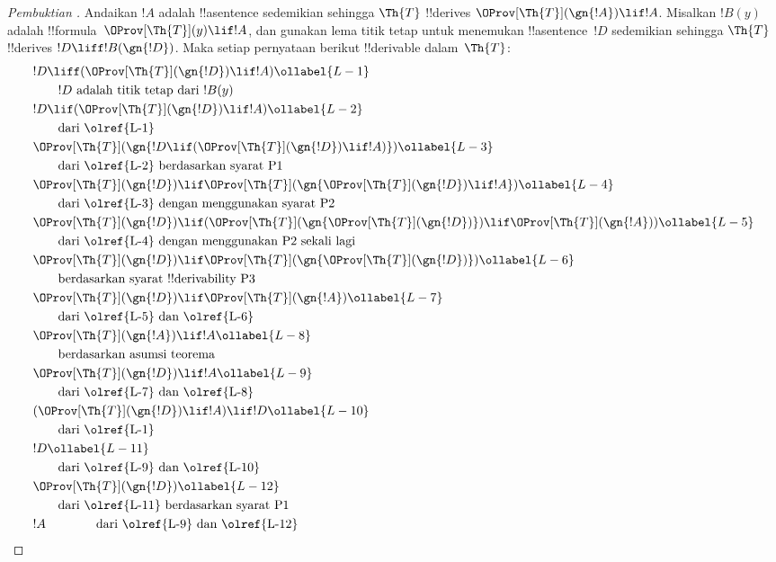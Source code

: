 \documentclass[../../../include/open-logic-section]{subfiles}
\begin{document}
\begin{proof}[Pembuktian ]
Andaikan $!A$ adalah !!a{sentence} sedemikian sehingga $\Th{T}$ !!{derive}s
$\OProv[\Th{T}](\gn{!A}) \lif !A$. Misalkan $!B(y)$ adalah
!!{formula}~$\OProv[\Th{T}](y) \lif !A$, dan gunakan lema titik tetap untuk
menemukan !!a{sentence}~$!D$ sedemikian sehingga $\Th{T}$ !!{derive}s
$!D \liff !B(\gn{!D})$. Maka setiap pernyataan berikut !!{derivable}
dalam~$\Th{T}$:
\begin{align}
  & !D \liff (\OProv[\Th{T}](\gn{!D}) \lif !A) \ollabel{L-1}\\
  & \qquad \text{$!D$ adalah titik tetap dari~$!B(y)$}\notag \\
  & !D \lif (\OProv[\Th{T}](\gn{!D}) \lif !A) \ollabel{L-2}\\
  & \qquad\text{dari \olref{L-1}}\notag\\
  & \OProv[\Th{T}](\gn{!D \lif (\OProv[\Th{T}](\gn{!D}) \lif !A)}) \ollabel{L-3}\\
  & \qquad \text{dari \olref{L-2} berdasarkan syarat P1}\notag \\
  & \OProv[\Th{T}](\gn{!D}) \lif \OProv[\Th{T}](\gn{\OProv[\Th{T}](\gn{!D}) \lif !A})
  \ollabel{L-4}\\
  &\qquad \text{dari \olref{L-3} dengan menggunakan syarat P2}\notag \\
  & \OProv[\Th{T}](\gn{!D}) \lif (\OProv[\Th{T}](\gn{\OProv[\Th{T}](\gn{!D})}) \lif \OProv[\Th{T}](\gn{!A})) \ollabel{L-5}\\
  &\qquad \text{dari \olref{L-4} dengan menggunakan P2 sekali lagi} \notag\\
& \OProv[\Th{T}](\gn{!D}) \lif \OProv[\Th{T}](\gn{\OProv[\Th{T}](\gn{!D})}) \ollabel{L-6}\\
  & \qquad\text{berdasarkan syarat !!{derivability} P3} \notag\\
  & \OProv[\Th{T}](\gn{!D}) \lif \OProv[\Th{T}](\gn{!A}) \ollabel{L-7} \\
  &\qquad\text{dari \olref{L-5} dan \olref{L-6}}\notag\\
  & \OProv[\Th{T}](\gn{!A}) \lif !A \ollabel{L-8}\\
  &\qquad\text{berdasarkan asumsi teorema} \notag\\
  & \OProv[\Th{T}](\gn{!D}) \lif !A \ollabel{L-9}\\
  &\qquad\text{dari \olref{L-7} dan \olref{L-8}}\notag\\
  & (\OProv[\Th{T}](\gn{!D}) \lif !A) \lif !D \ollabel{L-10}\\
  & \qquad \text{dari \olref{L-1}}\notag \\
  & !D \ollabel{L-11}\\
  & \qquad\text{dari \olref{L-9} dan \olref{L-10}}\notag \\
  & \OProv[\Th{T}](\gn{!D}) \ollabel{L-12}\\
  & \qquad\text{dari \olref{L-11} berdasarkan syarat~P1}\notag \\
  & !A \qquad\qquad\text{dari \olref{L-9} dan \olref{L-12}}\notag
\end{align}
\end{proof}
\end{document}
